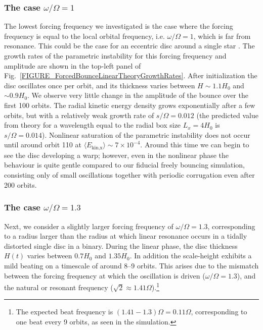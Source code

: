 \documentclass[fleqn,usenatbib]{mnras}
\begin{document}
\subsubsection{The case $\omega/\Omega = 1$}
\label{SECTION_ForcedBounceSimulation_Omega1pt00_a0pt1}
The lowest forcing frequency we investigated is the case where the forcing frequency is equal to the local orbital frequency, i.e. $\omega/\Omega = 1$, which is far from resonance. This could be the case for an eccentric disc around a single star \citep[see, e.g.,][]{wienkers2018non}. The growth rates of the parametric instability for this forcing frequency and amplitude are shown in the top-left panel of Fig.~\ref{FIGURE_ForcedBounceLinearTheoryGrowthRates}. After initialization the disc oscillates once per orbit, and its thickness varies between $H \sim 1.1H_0$ and $\sim 0.9H_0$. We observe very little change in the amplitude of the bounce over the first 100 orbits. The radial kinetic energy density grows exponentially after a few orbits, but with a relatively weak growth rate of $s/\Omega = 0.012$ (the predicted value from theory for a wavelength equal to the radial box size $L_x=4H_0$ is $s/\Omega = 0.014$). Nonlinear saturation of the parametric instability does not occur until around orbit 110 at $\langle E_\text{kin,x} \rangle \sim 7\times10^{-4}$. Around this time we can begin to see the disc developing a warp; however, even in the nonlinear phase the behaviour is quite gentle compared to our fiducial freely bouncing simulation, consisting only of small oscillations together with periodic corrugation even after 200 orbits. 

\subsubsection{The case $\omega/\Omega = 1.3$}
\label{SECTION_ForcedBounceSimulation_Omega1pt30_a0pt1}
Next, we consider a slightly larger forcing frequency of $\omega/\Omega = 1.3$, corresponding to a radius larger than the radius at which linear resonance occurs in a tidally distorted single disc in a binary. During the linear phase, the disc thickness $H(t)$ varies between $0.7H_0$ and $1.35H_0$. In addition the scale-height exhibits a mild beating on a timescale of around 8--9 orbits. This arises due to the mismatch between the forcing frequency at which the oscillation is driven ($\omega/\Omega = 1.3$), and the natural or resonant frequency ($\sqrt{2} \approx 1.41\Omega$).\footnote{The expected beat frequency is $(1.41-1.3)\Omega=0.11\Omega$, corresponding to one beat every 9 orbits, as seen in the simulation.}
\end{document}
